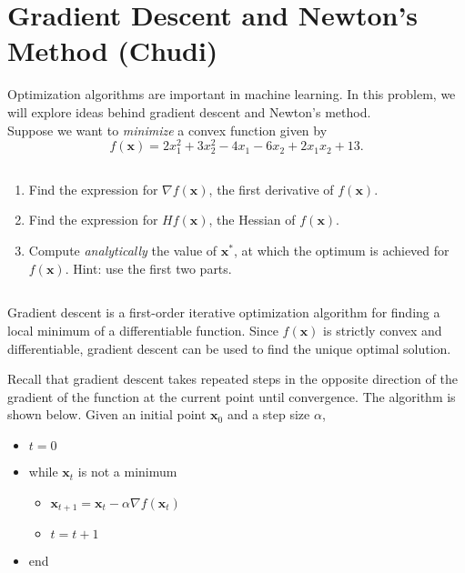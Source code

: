 \documentclass{exam}
\begin{document}
\section{Gradient Descent and Newton's Method (Chudi)}

Optimization algorithms are important in machine learning. In this problem, we will explore ideas behind gradient descent and Newton's method. 
\\
Suppose we want to \textit{minimize} a convex function given by $$f(\bm{x}) = 2x_1^2 + 3x_2^2 - 4x_1 - 6x_2+2x_1 x_2 + 13.$$

\subsection{}
\begin{enumerate}[label=(\alph*)]
    \item Find the expression for $\nabla f(\bm{x})$, the first derivative of $f(\bm{x})$.
    \item Find the expression for $H f(\bm{x})$, the Hessian of $f(\bm{x})$.  
    \item Compute \textit{analytically} the value of $\bm{x}^*$, at which the optimum is achieved for $f(\bm{x})$. Hint: use the first two parts.
\end{enumerate}

\subsection{}
Gradient descent is a first-order iterative optimization algorithm for finding a local minimum of a differentiable function. 
Since $f(\bm{x})$ is strictly convex and differentiable, gradient descent can be used to find the unique optimal solution.

Recall that gradient descent takes repeated steps in the opposite direction of the gradient of the function at the current point until convergence. The algorithm is shown below. Given an initial point $\bm{x}_0$ and a step size $\alpha$, 

\begin{itemize}
    \item $t=0$
    \item while $\bm{x}_t$ is not a minimum
    \begin{itemize}
        \item $\bm{x}_{t+1} = \bm{x}_t - \alpha \nabla f(\bm{x}_t)$
        \item $t = t+1$
    \end{itemize}
    \item end
\end{itemize}
\end{document}
